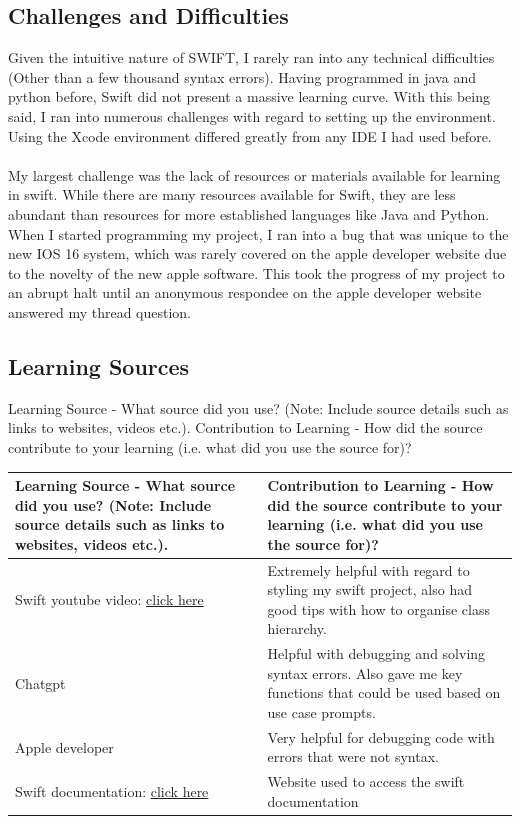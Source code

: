 \documentclass[a4paper, 11pt]{report}
\begin{document}
\subsection{Challenges and Difficulties}
Given the intuitive nature of SWIFT, I rarely ran into any technical difficulties (Other than a few thousand syntax errors). Having programmed in java and python before, Swift did not present a massive learning curve. With this being said, I ran into numerous challenges with regard to setting up the environment. Using the Xcode environment differed greatly from any IDE I had used before.\\
\\
My largest challenge was the lack of resources or materials available for learning in swift. While there are many resources available for Swift, they are less abundant than resources for more established languages like Java and Python. When I started programming my project, I ran into a bug that was unique to the new IOS 16 system, which was rarely covered on the apple developer website due to the novelty of the new apple software. This took the progress of my project to an abrupt halt until an anonymous respondee on the apple developer website answered my thread question.


\subsection{Learning Sources}
Learning Source - What source did you use? (Note: Include source details such as links to websites, videos etc.).	Contribution to Learning - How did the source contribute to your learning (i.e. what did you use the source for)?

\begin{tabular}{|p{}|p{}|}
	\hline
	Learning Source - What source did you use? (Note: Include source details such as links to websites, videos etc.). & Contribution to Learning - How did the source contribute to your learning (i.e. what did you use the source for)?\\
	\hline
Swift youtube video: \href{https://www.youtube.com/watch?v=6v4fmg9iRSU&t=87s&ab_channel=iOSAcademy}{click here} & Extremely helpful with regard to styling my swift project, also had good tips with how to organise class hierarchy.\\
	\hline
	Chatgpt & Helpful with debugging and solving syntax errors. Also gave me key functions that could be used based on use case prompts.\\
	\hline
	Apple developer & Very helpful for debugging code with errors that were not syntax.\\
	\hline
	Swift documentation: \href{https://www.swift.org/documentation/}{click here}  & Website used to access the swift documentation\\
	\hline
\end{tabular}
\end{document}
